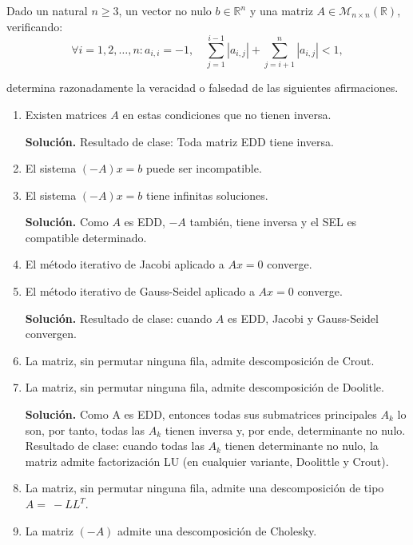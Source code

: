 \documentclass[12pt]{article}
\begin{document}
	\newpage
	\setcounter{ejercicio}{0}
	
	\begin{ejercicio}[3 puntos]
		Dado un natural $n \geq 3$, un vector no nulo $b \in \mathbb{R}^n$ y una matriz $A \in \mathcal{M}_{n \times n}(\mathbb{R})$, verificando:
		$$ \forall i = 1, 2, \ldots, n : a_{i,i} = -1, \quad \sum_{j=1}^{i-1} |a_{i,j}| + \sum_{j=i+1}^{n} |a_{i,j}| < 1, $$
		
		determina razonadamente la veracidad o falsedad de las siguientes afirmaciones.
		\begin{enumerate}[label=\alph*)]
			\item Existen matrices $A$ en estas condiciones que no tienen inversa.
			
				\textbf{Solución. } Resultado de clase: Toda matriz EDD tiene inversa.
			
			\item El sistema $(-A)x = b$ puede ser incompatible.
			\item El sistema $(-A)x = b$ tiene infinitas soluciones.
				
				\textbf{Solución. } Como $A$ es EDD, $-A$ también, tiene inversa y el SEL es compatible determinado.
				
			\item El método iterativo de Jacobi aplicado a $Ax = 0$ converge.
			\item El método iterativo de Gauss-Seidel aplicado a $Ax = 0$ converge.
			
				\textbf{Solución. } Resultado de clase: cuando $A$ es EDD, Jacobi y Gauss-Seidel convergen.
			
			\item La matriz, sin permutar ninguna fila, admite descomposición de Crout.
			\item La matriz, sin permutar ninguna fila, admite descomposición de Doolitle.
			
				\textbf{Solución. } Como A es EDD, entonces todas sus submatrices principales $A_k$ lo son, por tanto, todas las $A_k$ tienen inversa y, por ende, determinante no nulo. Resultado de clase: cuando todas las $A_k$ tienen determinante no nulo, la matriz admite factorización LU (en cualquier variante, Doolittle y Crout).
			
			\item La matriz, sin permutar ninguna fila, admite una descomposición de tipo $A=~-LL^T$.
			\item La matriz $(-A)$ admite una descomposición de Cholesky.
			

\end{enumerate}
\end{ejercicio}
\end{document}
